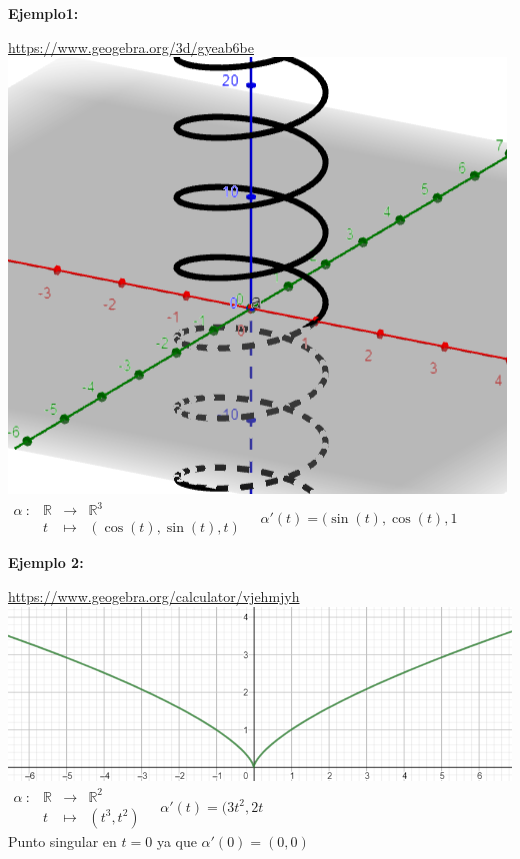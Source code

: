 \documentclass{article}
\begin{document}
\textbf{Ejemplo1:}
\begin{center}
    \url{https://www.geogebra.org/3d/gyeab6be}\\
    \includegraphics[scale=0.3]{figuras/ejemplos 1/sacacorchos.PNG}\\
    $\begin{array}{cccl}
    \alpha\::&\mathbb{R}&\longrightarrow&\mathbb{R}^3\\
        &t&\longmapsto&(\cos(t),\sin(t),t)
\end{array} \quad \alpha'(t)=(\sin(t),\cos(t),1$
\end{center}
\textbf{Ejemplo 2:}
\begin{center}
    \url{https://www.geogebra.org/calculator/vjehmjyh}\\
    \includegraphics[scale=0.4]{figuras/ejemplos 1/ejemplo punto singular.PNG}\\
    $\begin{array}{cccl}
    \alpha\::&\mathbb{R}&\longrightarrow&\mathbb{R}^2\\
        &t&\longmapsto&(t^3,t^2)
\end{array} \quad \alpha'(t)=(3t^2,2t$\\
Punto singular en $t=0$ ya que $\alpha'(0)=(0,0)$
\end{center}
\end{document}
